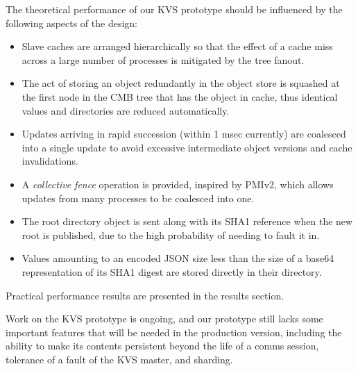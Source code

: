 The theoretical performance of our KVS prototype should be influenced by
the following aspects of the design:
\begin{itemize}
\item{Slave caches are arranged hierarchically so that the effect of a
cache miss across a large number of processes is mitigated by the tree
fanout.}
\item{The act of storing an object redundantly in the object store
is squashed at the first node in the CMB tree that has the object
in cache, thus identical values and directories are reduced automatically.}
\item{Updates arriving in rapid succession (within 1 msec currently) are
coalesced into a single update to avoid excessive intermediate object
versions and cache invalidations.}
\item{A {\em collective fence} operation is provided, inspired by PMIv2,
which allows updates from many processes to be coalesced into one.}
\item{The root directory object is sent along with its SHA1 reference when the
new root is published, due to the high probability of needing to fault it in.}
\item{Values amounting to an encoded JSON size less than the size of a base64
representation of its SHA1 digest are stored directly in their directory.}
\end{itemize}
Practical performance results are presented in the results section.

Work on the KVS prototype is ongoing, and our prototype still lacks some
important features that will be needed in the production version,
including the ability to make its contents persistent beyond the
life of a comms session,
tolerance of a fault of the KVS master,
and sharding.
